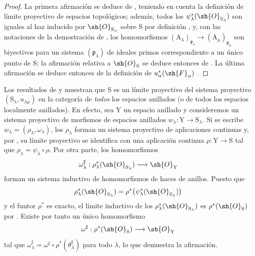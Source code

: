 \begin{proof}
La primera afirmación se deduce de , teniendo en cuenta la definición de límite proyectivo de espacios topológicos; además, todos los $\psi_\lambda^*(\sh{O}_{\mathrm{S}_\lambda})$ son iguales al haz inducido por $\sh{O}_{\mathrm{S}_\alpha}$ sobre $\mathrm{S}$ por definición , y, con las notaciones de la demostración de , los homomorfismos $(\mathrm{A}_\lambda)_{\mathfrak{p}_\lambda}\to(\mathrm{A}_\mu)_{\mathfrak{p}_\mu}$ son biyectivos para un sistema $(\mathfrak{p}_\lambda)$ de ideales primos correspondiente a un único punto de $\mathrm{S}$; la afirmación relativa a $\sh{O}_\mathrm{S}$ se deduce entonces de .
La última afirmación se deduce entonces de la definición de $u_\alpha^*(\sh{F}_\alpha)$ .
\end{proof}

\begin{remark}[8.2.14]
\label{IV.8.2.14}
Los resultados de  y  muestran que $\mathrm{S}$ es un límite proyectivo del sistema proyectivo $(\mathrm{S}_\lambda,u_{\lambda\mu})$ en la categoría de \emph{todos} los espacios anillados (o de todos los espacios localmente anillados).
En efecto, sea $\mathrm{Y}$ un espacio anillado y consideremos un sistema proyectivo de morfismos de espacios anillados $w_\lambda:\mathrm{Y}\to\mathrm{S}_\lambda$.
Si se escribe $w_\lambda=(\rho_\lambda,\omega_\lambda)$, los $\rho_\lambda$ forman un sistema proyectivo de aplicaciones continuas y, por , su límite proyectivo se identifica con una aplicación continua $\rho:\mathrm{Y}\to\mathrm{S}$ tal que $\rho_\lambda=\psi_\lambda\circ\rho$. Por otra parte, los homomorfismos
\[
 \omega_\lambda^\sharp:\rho_\lambda^*(\sh{O}_{\mathrm{S}_\lambda})\longrightarrow\sh{O}_\mathrm{Y}
\]
forman un sistema inductivo de homomorfismos de haces de anillos. Puesto que
\[
 \rho_\lambda^*(\sh{O}_{\mathrm{S}_\lambda})
 =\rho^*\bigl(\psi_\lambda^*(\sh{O}_{\mathrm{S}_\lambda})\bigr)
\]
y el funtor $\rho^*$ es exacto, el límite inductivo de los $\rho_\lambda^*(\sh{O}_{\mathrm{S}_\lambda})$ es $\rho^*(\sh{O}_\mathrm{S})$ por . Existe por tanto un único homomorfismo
\[
 \omega^\sharp:\rho^*(\sh{O}_\mathrm{S})\longrightarrow\sh{O}_\mathrm{Y}
\]
tal que $\omega_\lambda^\sharp=\omega^\sharp\circ\rho^*(\theta_\lambda^\sharp)$ para todo $\lambda$, lo que demuestra la afirmación.
\end{remark}

